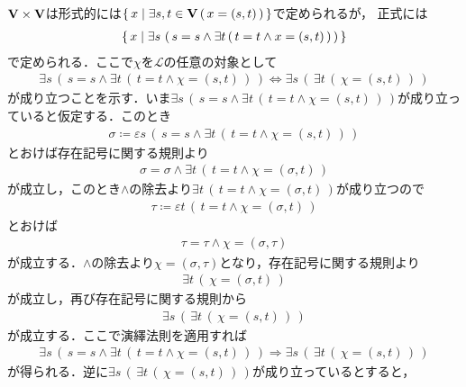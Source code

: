	\begin{prf}
		$\mathbf{V} \times \mathbf{V}$は形式的には$\left\{\, x \mid \exists s,t \in \mathbf{V}\, (\, x=(s,t)\, )\, \right\}$で定められるが，
		正式には
		\begin{align}
			\left\{\, x \mid \exists s\, \left(\, s = s \wedge \exists t\, (\, t=t \wedge x=(s,t)\, )\, \right)\, \right\}
		\end{align}
		で定められる．ここで$\chi$を$\mathcal{L}$の任意の対象として
		\begin{align}
			\exists s\, \left(\, s = s \wedge \exists t\, (\, t=t \wedge \chi=(s,t)\, )\, \right)
			\Longleftrightarrow \exists s\, \left(\, \exists t\, (\, \chi=(s,t)\, )\, \right)
			\label{eq:thm_Cartesian_product_of_the_Universe}
		\end{align}
		が成り立つことを示す．いま$\exists s\, \left(\, s = s \wedge \exists t\, (\, t=t \wedge \chi=(s,t)\, )\, \right)$が成り立っていると仮定する．このとき
		\begin{align}
			\sigma \coloneqq \varepsilon s\, \left(\, s = s \wedge \exists t\, (\, t=t \wedge \chi=(s,t)\, )\, \right)
		\end{align}
		とおけば存在記号に関する規則より
		\begin{align}
			\sigma = \sigma \wedge \exists t\, (\, t=t \wedge \chi=(\sigma,t)\, )
		\end{align}
		が成立し，このとき$\wedge$の除去より$\exists t\, (\, t=t \wedge \chi=(\sigma,t)\, )$が成り立つので
		\begin{align}
			\tau \coloneqq \varepsilon t\, (\, t=t \wedge \chi=(\sigma,t)\, )
		\end{align}
		とおけば
		\begin{align}
			\tau = \tau \wedge \chi = (\sigma,\tau)
		\end{align}
		が成立する．$\wedge$の除去より$\chi = (\sigma,\tau)$となり，存在記号に関する規則より
		\begin{align}
			\exists t\, (\, \chi = (\sigma,t)\, )
		\end{align}
		が成立し，再び存在記号に関する規則から
		\begin{align}
			\exists s\, \left(\, \exists t\, (\, \chi = (s,t)\, )\, \right)
		\end{align}
		が成立する．ここで演繹法則を適用すれば
		\begin{align}
			\exists s\, \left(\, s = s \wedge \exists t\, (\, t=t \wedge \chi=(s,t)\, )\, \right)
			\Longrightarrow \exists s\, \left(\, \exists t\, (\, \chi=(s,t)\, )\, \right)
		\end{align}
		が得られる．逆に$\exists s\, \left(\, \exists t\, (\, \chi=(s,t)\, )\, \right)$が成り立っているとすると，

\end{prf}
